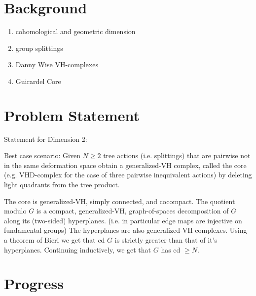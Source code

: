 \documentclass{article}
\theoremstyle{mystyle}
\theoremstyle{remark}
\begin{document}
\section{Background}

\begin{enumerate}
    \item cohomological and geometric dimension
    \item group splittings
    \item Danny Wise VH-complexes
    \item Guirardel Core
\end{enumerate}

\section{Problem Statement}

Statement for Dimension 2: 

Best case scenario: Given \(N \geq 2\) tree actions (i.e. splittings) that are pairwise not in the same deformation space obtain a generalized-VH complex, called the core (e.g. VHD-complex for the case of three pairwise inequivalent actions) by deleting light quadrants from the tree product.

The core is generalized-VH, simply connected, and cocompact. The quotient modulo \(G\) is a compact, generalized-VH, graph-of-spaces decomposition of \(G\) along its (two-sided) hyperplanes. (i.e. in particular edge maps are injective on fundamental groups) The hyperplanes are also generalized-VH complexes. Using a theorem of Bieri we get that cd \(G\) is strictly greater than that of it's hyperplanes. Continuing inductively, we get that \(G\) has cd \(\geq N\).

\section{Progress}
\end{document}
